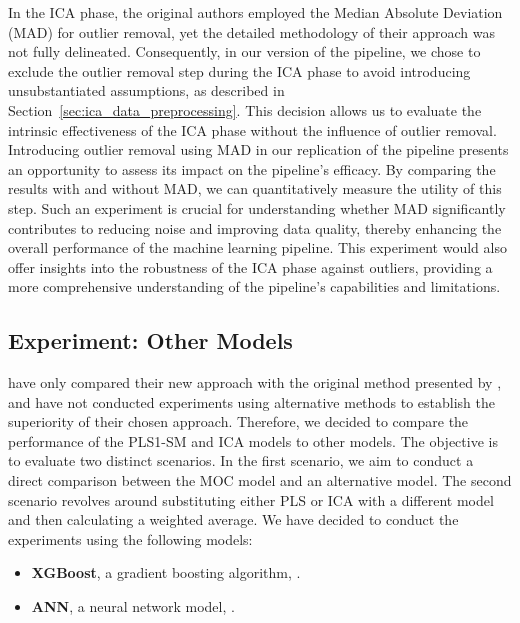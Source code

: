 In the ICA phase, the original authors employed the Median Absolute Deviation (MAD) for outlier removal, yet the detailed methodology of their approach was not fully delineated.
Consequently, in our version of the pipeline, we chose to exclude the outlier removal step during the ICA phase to avoid introducing unsubstantiated assumptions, as described in Section~\ref{sec:ica_data_preprocessing}.
This decision allows us to evaluate the intrinsic effectiveness of the ICA phase without the influence of outlier removal.
Introducing outlier removal using MAD in our replication of the pipeline presents an opportunity to assess its impact on the pipeline's efficacy.
By comparing the results with and without MAD, we can quantitatively measure the utility of this step.
Such an experiment is crucial for understanding whether MAD significantly contributes to reducing noise and improving data quality, thereby enhancing the overall performance of the machine learning pipeline.
This experiment would also offer insights into the robustness of the ICA phase against outliers, providing a more comprehensive understanding of the pipeline's capabilities and limitations.

\subsection{Experiment: Other Models}\label{sec:experiment_other_models}
\citet{cleggRecalibrationMarsScience2017} have only compared their new approach with the original method presented by \citet{wiensPreFlight3}, and have not conducted experiments using alternative methods to establish the superiority of their chosen approach.
Therefore, we decided to compare the performance of the PLS1-SM and ICA models to other models.
The objective is to evaluate two distinct scenarios.
In the first scenario, we aim to conduct a direct comparison between the MOC model and an alternative model. The second scenario revolves around substituting either PLS or ICA with a different model and then calculating a weighted average.
We have decided to conduct the experiments using the following models:

\begin{itemize}
	\item \textbf{XGBoost}, a gradient boosting algorithm, \cite{chen_xgboost_2016}.
	\item \textbf{ANN}, a neural network model, \cite{scikit-learn}.
\end{itemize}

